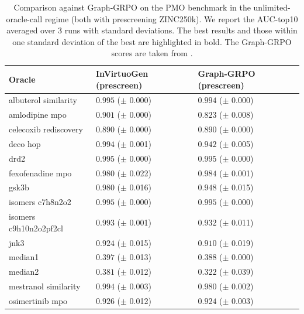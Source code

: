 \documentclass{article} %
\begin{document}
\begin{table}[ht]
\centering
\caption{Comparison against Graph-GRPO on the PMO benchmark in the unlimited-oracle-call regime (both with prescreening ZINC250k). We report the AUC-top10 averaged over 3 runs with standard deviations. The best results and those within one standard deviation of the best are highlighted in bold. The Graph-GRPO scores are taken from \citep{graphgrpo}.}
\label{tab:unlimited_prescreen}
\begin{tabularx}{\linewidth}{l|>{}p{2.2cm} Y }
\toprule
Oracle & InVirtuoGen (prescreen) & Graph-GRPO (prescreen) \\
\midrule
\small{albuterol similarity} & $\mathbf{0.995}$ {\tiny ($\pm$ 0.000)} & $0.994$ {\tiny ($\pm$ 0.000)} \\
\small{amlodipine mpo} & $\mathbf{0.901}$ {\tiny ($\pm$ 0.000)} & $0.823$ {\tiny ($\pm$ 0.008)} \\
\small{celecoxib rediscovery} & $\mathbf{0.890}$ {\tiny ($\pm$ 0.000)} & $\mathbf{0.890}$ {\tiny ($\pm$ 0.000)} \\
\small{deco hop} & $\mathbf{0.994}$ {\tiny ($\pm$ 0.001)} & $0.942$ {\tiny ($\pm$ 0.005)} \\
\small{drd2} & $\mathbf{0.995}$ {\tiny ($\pm$ 0.000)} & $\mathbf{0.995}$ {\tiny ($\pm$ 0.000)} \\
\small{fexofenadine mpo} & $0.980$ {\tiny ($\pm$ 0.022)} & $\mathbf{0.984}$ {\tiny ($\pm$ 0.001)} \\
\small{gsk3b} & $\mathbf{0.980}$ {\tiny ($\pm$ 0.016)} & $0.948$ {\tiny ($\pm$ 0.015)} \\
\small{isomers c7h8n2o2} & $\mathbf{0.995}$ {\tiny ($\pm$ 0.000)} & $\mathbf{0.995}$ {\tiny ($\pm$ 0.000)} \\
\small{isomers c9h10n2o2pf2cl} & $\mathbf{0.993}$ {\tiny ($\pm$ 0.001)} & $0.932$ {\tiny ($\pm$ 0.011)} \\
\small{jnk3} & $\mathbf{0.924}$ {\tiny ($\pm$ 0.015)} & $\mathbf{0.910}$ {\tiny ($\pm$ 0.019)} \\
\small{median1} & $\mathbf{0.397}$ {\tiny ($\pm$ 0.013)} & $\mathbf{0.388}$ {\tiny ($\pm$ 0.000)} \\
\small{median2} & $\mathbf{0.381}$ {\tiny ($\pm$ 0.012)} & $0.322$ {\tiny ($\pm$ 0.039)} \\
\small{mestranol similarity} & $\mathbf{0.994}$ {\tiny ($\pm$ 0.003)} & $0.980$ {\tiny ($\pm$ 0.002)} \\
\small{osimertinib mpo} & $\mathbf{0.926}$ {\tiny ($\pm$ 0.012)} & $\mathbf{0.924}$ {\tiny ($\pm$ 0.003)} \\

\end{tabularx}
\end{table}
\end{document}

